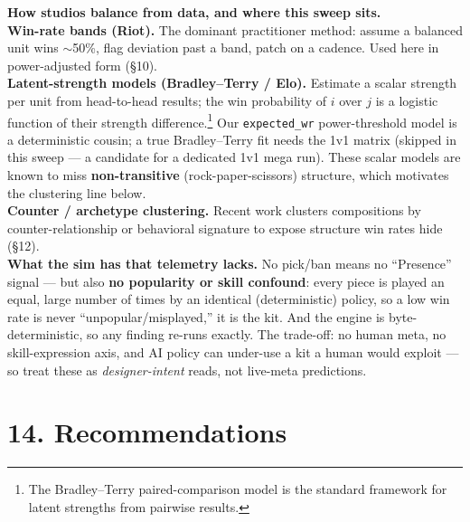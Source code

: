 \documentclass[10pt]{article}
\begin{document}
\begin{quotebox}
\textbf{How studios balance from data, and where this sweep sits.}\\[2pt]
\textbf{Win-rate bands (Riot).} The dominant practitioner method: assume a balanced unit wins $\sim$50\%, flag deviation past a band, patch on a cadence. Used here in power-adjusted form (\S{}10).\\[2pt]
\textbf{Latent-strength models (Bradley--Terry / Elo).} Estimate a scalar strength per unit from head-to-head results; the win probability of $i$ over $j$ is a logistic function of their strength difference.\footnote{The Bradley--Terry paired-comparison model is the standard framework for latent strengths from pairwise results.} Our \texttt{expected\_\allowbreak{}wr} power-threshold model is a deterministic cousin; a true Bradley--Terry fit needs the 1v1 matrix (skipped in this sweep --- a candidate for a dedicated 1v1 mega run). These scalar models are known to miss \textbf{non-transitive} (rock-paper-scissors) structure, which motivates the clustering line below.\\[2pt]
\textbf{Counter / archetype clustering.} Recent work clusters compositions by counter-relationship or behavioral signature to expose structure win rates hide (\S{}12).\\[2pt]
\textbf{What the sim has that telemetry lacks.} No pick/ban means no ``Presence'' signal --- but also \textbf{no popularity or skill confound}: every piece is played an equal, large number of times by an identical (deterministic) policy, so a low win rate is never ``unpopular/misplayed,'' it is the kit. And the engine is byte-deterministic, so any finding re-runs exactly. The trade-off: no human meta, no skill-expression axis, and AI policy can under-use a kit a human would exploit --- so treat these as \emph{designer-intent} reads, not live-meta predictions.
\end{quotebox}

\section*{14. Recommendations}
\end{document}
